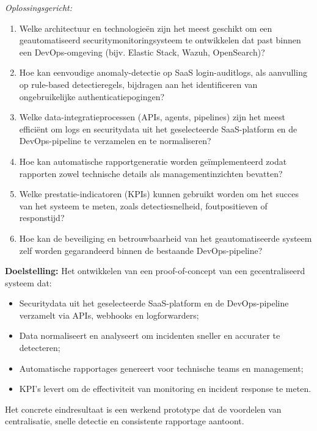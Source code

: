 \emph{Oplossingsgericht:}
\begin{enumerate}
    \item Welke architectuur en technologieën zijn het meest geschikt om een geautomatiseerd securitymonitoringsysteem te ontwikkelen dat past binnen een DevOps-omgeving (bijv. Elastic Stack, Wazuh, OpenSearch)?
    \item Hoe kan eenvoudige anomaly-detectie op SaaS login-auditlogs, als aanvulling op rule-based detectieregels, bijdragen aan het identificeren van ongebruikelijke authenticatiepogingen?
    \item Welke data-integratieprocessen (APIs, agents, pipelines) zijn het meest efficiënt om logs en securitydata uit het geselecteerde SaaS-platform en de DevOps-pipeline te verzamelen en te normaliseren?
    \item Hoe kan automatische rapportgeneratie worden geïmplementeerd zodat rapporten zowel technische details als managementinzichten bevatten?
    \item Welke prestatie-indicatoren (KPIs) kunnen gebruikt worden om het succes van het systeem te meten, zoals detectiesnelheid, foutpositieven of responstijd?
    \item Hoe kan de beveiliging en betrouwbaarheid van het geautomatiseerde systeem zelf worden gegarandeerd binnen de bestaande DevOps-pipeline?
\end{enumerate}

\textbf{Doelstelling:}  
Het ontwikkelen van een proof-of-concept van een gecentraliseerd systeem dat:
\begin{itemize}
    \item Securitydata uit het geselecteerde SaaS-platform en de DevOps-pipeline verzamelt via APIs, webhooks en logforwarders;
    \item Data normaliseert en analyseert om incidenten sneller en accurater te detecteren;
    \item Automatische rapportages genereert voor technische teams en management;
    \item KPI’s levert om de effectiviteit van monitoring en incident response te meten.
\end{itemize}

Het concrete eindresultaat is een werkend prototype dat de voordelen van centralisatie, snelle detectie en consistente rapportage aantoont.

